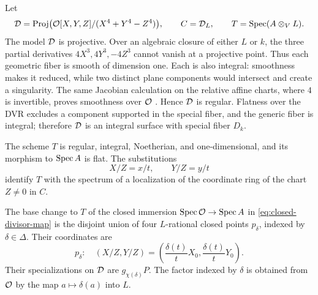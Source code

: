 Let
\[
    \mathcal D=\operatorname{Proj}\bigl(\mathcal O[X,Y,Z]/(X^4+Y^4-Z^4)\bigr),
    \qquad C=\mathcal D_L,
    \qquad T=\operatorname{Spec}(A\otimes_V L).
\]
The model $\mathcal D$ is projective. Over an algebraic closure of either
$L$ or $k$, the three partial derivatives $4X^3,4Y^3,-4Z^3$ cannot
vanish at a projective point. Thus each geometric fiber is smooth of
dimension one. Each is also integral: smoothness makes it reduced,
while two distinct plane components would intersect and create a
singularity. The same Jacobian calculation on the relative affine charts,
where $4$ is invertible, proves smoothness over $\mathcal O$
\cite[Tag \texttt{00TE}]{StacksProject}. Hence $\mathcal D$ is regular.
Flatness over the DVR excludes a component supported in the special
fiber, and the generic fiber is integral; therefore $\mathcal D$ is an
integral surface with special fiber $D_k$.

\begin{lemma}
\label{lem:splitting}
The scheme $T$ is regular, integral, Noetherian, and one-dimensional,
and its morphism to $\operatorname{Spec} A$ is flat. The substitutions
\[
    X/Z=x/t,\qquad Y/Z=y/t
\]
identify $T$ with the spectrum of a localization of the coordinate
ring of the chart $Z\ne0$ in $C$.

The base change to $T$ of the closed immersion
$\operatorname{Spec}\mathcal O\to\operatorname{Spec} A$ in \eqref{eq:closed-divisor-map} is the disjoint
union of four $L$-rational closed points $p_\delta$, indexed by
$\delta\in\Delta$. Their coordinates are
\begin{equation}
\label{eq:split-points}
    p_\delta:
    \quad (X/Z,Y/Z)=
    \left(\frac{\delta(t)}tX_0,
          \frac{\delta(t)}tY_0\right).
\end{equation}
Their specializations on $\mathcal D$ are $g_{\chi(\delta)}P$.
The factor indexed by $\delta$ is obtained from $\mathcal O$ by the map
$a\mapsto\delta(a)$ into $L$.
\end{lemma}

